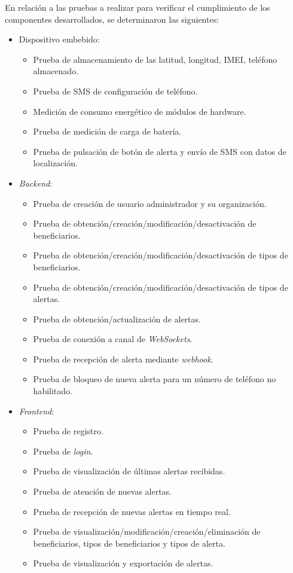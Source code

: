 En relación a las pruebas a realizar para verificar el cumplimiento de los componentes desarrollados, se determinaron las siguientes:

\begin{itemize}
\item Dispositivo embebido:
	\begin{itemize}
	\item Prueba de almacenamiento de las latitud, longitud, IMEI, teléfono almacenado.
	\item Prueba de SMS de configuración de teléfono.
	\item Medición de consumo energético de módulos de hardware.
	\item Prueba de medición de carga de batería.
	\item Prueba de pulsación de botón de alerta y envío de SMS con datos de localización.
	\end{itemize}
\item \textit{Backend}:
	\begin{itemize}
	\item Prueba de creación de usuario administrador y su organización.
	\item Prueba de obtención/creación/modificación/desactivación de beneficiarios.
	\item Prueba de obtención/creación/modificación/desactivación de tipos de beneficiarios.
	\item Prueba de obtención/creación/modificación/desactivación de tipos de alertas.
	\item Prueba de obtención/actualización de alertas.
	\item Prueba de conexión a canal de \textit{WebSockets}.
	\item Prueba de recepción de alerta mediante \textit{webhook}.
	\item Prueba de bloqueo de nueva alerta para un número de teléfono no habilitado.
	\end{itemize}
\item \textit{Frontend}:
	\begin{itemize}
	\item Prueba de registro.
	\item Prueba de \textit{login}.
	\item Prueba de visualización de últimas alertas recibidas.
	\item Prueba de atención de nuevas alertas.
	\item Prueba de recepción de nuevas alertas en tiempo real.
	\item Prueba de visualización/modificación/creación/eliminación de beneficiarios, tipos de beneficiarios y tipos de alerta.
	\item Prueba de visualización y exportación de alertas.
	\end{itemize}

\end{itemize}


